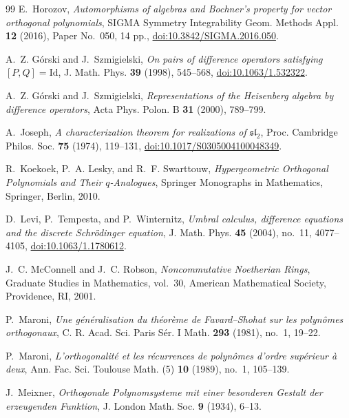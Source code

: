 \documentclass[11pt,reqno]{amsart}
\numberwithin{equation}{section}
\theoremstyle{definition}
\theoremstyle{remark}
\begin{document}
\begin{thebibliography}{99}
E.~Horozov,
\emph{Automorphisms of algebras and Bochner's property for vector orthogonal polynomials},
SIGMA Symmetry Integrability Geom. Methods Appl. \textbf{12} (2016), Paper No.~050, 14 pp.,
\href{https://doi.org/10.3842/SIGMA.2016.050}{doi:10.3842/SIGMA.2016.050}.

A.~Z. G\'orski and J.~Szmigielski,
\emph{On pairs of difference operators satisfying $[P,Q]=\mathrm{Id}$},
J. Math. Phys. \textbf{39} (1998), 545--568,
\href{https://doi.org/10.1063/1.532322}{doi:10.1063/1.532322}.

A.~Z. G\'orski and J.~Szmigielski,
\emph{Representations of the Heisenberg algebra by difference operators},
Acta Phys. Polon. B \textbf{31} (2000), 789--799.

A.~Joseph,
\emph{A characterization theorem for realizations of $\mathfrak{sl}_2$},
Proc. Cambridge Philos. Soc. \textbf{75} (1974), 119--131,
\href{https://doi.org/10.1017/S0305004100048349}{doi:10.1017/S0305004100048349}.

R.~Koekoek, P.~A. Lesky, and R.~F. Swarttouw,
\emph{Hypergeometric Orthogonal Polynomials and Their $q$-Analogues},
Springer Monographs in Mathematics, Springer, Berlin, 2010.

D.~Levi, P.~Tempesta, and P.~Winternitz,
\emph{Umbral calculus, difference equations and the discrete Schr\"odinger equation},
J. Math. Phys. \textbf{45} (2004), no.~11, 4077--4105,
\href{https://doi.org/10.1063/1.1780612}{doi:10.1063/1.1780612}.

J.~C. McConnell and J.~C. Robson,
\emph{Noncommutative Noetherian Rings},
Graduate Studies in Mathematics, vol.~30, American Mathematical Society, Providence, RI, 2001.

P.~Maroni,
\emph{Une g\'en\'eralisation du th\'eor\`eme de Favard--Shohat sur les polyn\^omes orthogonaux},
C. R. Acad. Sci. Paris S\'er. I Math. \textbf{293} (1981), no.~1, 19--22.

P.~Maroni,
\emph{L'orthogonalit\'e et les r\'ecurrences de polyn\^omes d'ordre sup\'erieur \`a deux},
Ann. Fac. Sci. Toulouse Math. (5) \textbf{10} (1989), no.~1, 105--139.

J.~Meixner,
\emph{Orthogonale Polynomsysteme mit einer besonderen Gestalt der erzeugenden Funktion},
J. London Math. Soc. \textbf{9} (1934), 6--13.


\end{thebibliography}
\end{document}
